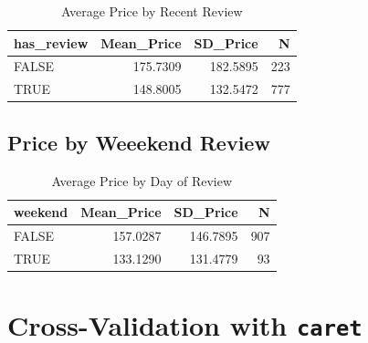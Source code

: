 \documentclass[]{book}
\newenvironment{Shaded}{\begin{snugshade}}{\end{snugshade}}
\newcommand{\KeywordTok}[1]{\textcolor[rgb]{0.13,0.29,0.53}{\textbf{#1}}}
\newcommand{\DataTypeTok}[1]{\textcolor[rgb]{0.13,0.29,0.53}{#1}}
\newcommand{\StringTok}[1]{\textcolor[rgb]{0.31,0.60,0.02}{#1}}
\newcommand{\OperatorTok}[1]{\textcolor[rgb]{0.81,0.36,0.00}{\textbf{#1}}}
\newcommand{\NormalTok}[1]{#1}
\begin{document}
\begin{table}

\caption{\label{tab:unnamed-chunk-681}Average Price by Recent Review}
\centering
\begin{tabular}[t]{l|r|r|r}
\hline
has\_review & Mean\_Price & SD\_Price & N\\
\hline
FALSE & 175.7309 & 182.5895 & 223\\
\hline
TRUE & 148.8005 & 132.5472 & 777\\
\hline
\end{tabular}
\end{table}

\subsection{Price by Weeekend Review}\label{price-by-weeekend-review}

\begin{Shaded}
\end{Shaded}

\begin{table}

\caption{\label{tab:unnamed-chunk-682}Average Price by Day of Review}
\centering
\begin{tabular}[t]{l|r|r|r}
\hline
weekend & Mean\_Price & SD\_Price & N\\
\hline
FALSE & 157.0287 & 146.7895 & 907\\
\hline
TRUE & 133.1290 & 131.4779 & 93\\
\hline
\end{tabular}
\end{table}

\section{\texorpdfstring{Cross-Validation with
\texttt{caret}}{Cross-Validation with caret}}\label{cross-validation-with-caret}
\end{document}
